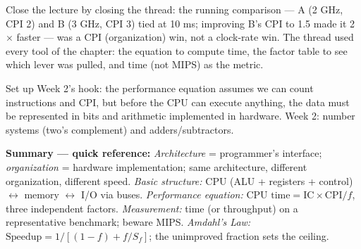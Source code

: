 \documentclass[11pt]{article}
\begin{document}
Close the lecture by closing the thread: the running comparison --- A (2 GHz, CPI 2) and B (3 GHz, CPI 3) tied at 10 ms; improving B's CPI to 1.5 made it 2$\times$ faster --- was a CPI (organization) win, not a clock-rate win. The thread used every tool of the chapter: the equation to compute time, the factor table to see which lever was pulled, and time (not MIPS) as the metric.

Set up Week 2's hook: the performance equation assumes we can count instructions and CPI, but before the CPU can execute anything, the data must be represented in bits and arithmetic implemented in hardware. Week 2: number systems (two's complement) and adders/subtractors.

\textbf{Summary --- quick reference:} \emph{Architecture} = programmer's interface; \emph{organization} = hardware implementation; same architecture, different organization, different speed. \emph{Basic structure:} CPU (ALU + registers + control) $\leftrightarrow$ memory $\leftrightarrow$ I/O via buses. \emph{Performance equation:} $\text{CPU time} = \text{IC} \times \text{CPI}/f$, three independent factors. \emph{Measurement:} time (or throughput) on a representative benchmark; beware MIPS. \emph{Amdahl's Law:} $\text{Speedup} = 1\big/[(1-f)+f/S_f]$; the unimproved fraction sets the ceiling.



\end{document}
